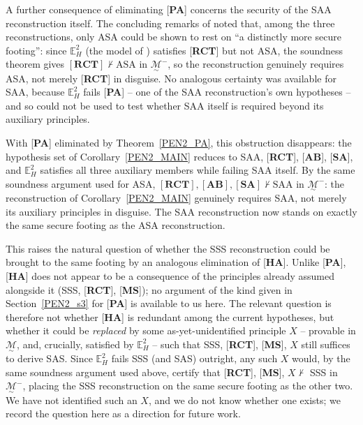 \documentclass[11pt,a4paper]{article}
\theoremstyle{definition}
\theoremstyle{remark}
\numberwithin{equation}{section}
\newcommand{\MG}{\underset{\sim}{\mathcal{M}}}
\begin{document}
A further consequence of eliminating [\textbf{PA}] concerns the security of the SAA
reconstruction itself. The concluding remarks of \cite{Volpe2026I} noted that, among the
three reconstructions, only ASA could be shown to rest on ``a distinctly more secure
footing'': since $\mathbb{E}_{H}^{2}$ (the model of \cite[Section~4]{Volpe2026I}) satisfies
[\textbf{RCT}] but not ASA, the soundness
theorem gives $[\textbf{RCT}]\not\vdash\textrm{ASA}$ in $\MG^{-}$, so the reconstruction
genuinely requires ASA, not merely [\textbf{RCT}] in disguise. No analogous certainty was
available for SAA, because $\mathbb{E}_{H}^{2}$ fails [\textbf{PA}] -- one of the SAA
reconstruction's own hypotheses -- and so could not be used to test whether SAA itself is
required beyond its auxiliary principles.

With [\textbf{PA}] eliminated by Theorem~\ref{PEN2_PA}, this obstruction disappears: the
hypothesis set of Corollary~\ref{PEN2_MAIN} reduces to SAA, [\textbf{RCT}], [\textbf{AB}],
[\textbf{SA}], and $\mathbb{E}_{H}^{2}$ satisfies all three auxiliary members while failing
SAA itself. By the same soundness argument used for ASA,
$[\textbf{RCT}],[\textbf{AB}],[\textbf{SA}]\not\vdash\textrm{SAA}$ in $\MG^{-}$: the
reconstruction of Corollary~\ref{PEN2_MAIN} genuinely requires SAA, not merely its auxiliary
principles in disguise. The SAA reconstruction now stands on exactly the same secure footing
as the ASA reconstruction.

This raises the natural question of whether the SSS reconstruction could be brought to the
same footing by an analogous elimination of [\textbf{HA}]. Unlike [\textbf{PA}],
[\textbf{HA}] does not appear to be a consequence of the principles already assumed alongside
it (SSS, [\textbf{RCT}], [\textbf{MS}]); no argument of the kind given in
Section~\ref{PEN2_s3} for [\textbf{PA}] is available to us here. The relevant question is
therefore not whether [\textbf{HA}] is redundant among the current hypotheses, but whether it
could be \emph{replaced} by some as-yet-unidentified principle $X$ -- provable in $\MG$, and, crucially,
satisfied by $\mathbb{E}_{H}^{2}$ -- such that SSS, [\textbf{RCT}], [\textbf{MS}], $X$ still
suffices to derive SAS. Since $\mathbb{E}_{H}^{2}$ fails SSS (and SAS) outright, any such $X$
would, by the same soundness argument used above, certify that
[\textbf{RCT}], [\textbf{MS}], $X\not\vdash$ SSS in $\MG^{-}$, placing the SSS reconstruction
on the same secure footing as the other two. We have not identified such an $X$, and we do
not know whether one exists; we record the question here as a direction for future work.
\end{document}
